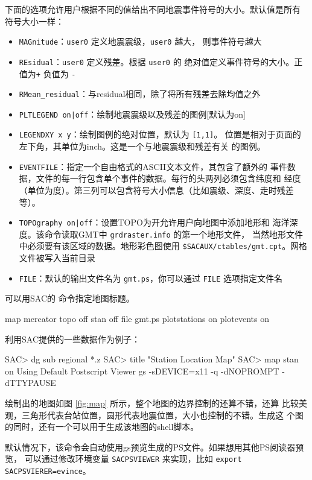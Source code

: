 下面的选项允许用户根据不同的值给出不同地震事件符号的大小。默认值是所有
符号大小一样：
\begin{itemize}
\item \texttt{MAGnitude}：\texttt{user0} 定义地震震级，\texttt{user0} 越大，
    则事件符号越大
\item \texttt{REsidual}：\texttt{user0} 定义残差。根据 \texttt{user0} 的
    绝对值定义事件符号的大小。正值为\texttt{+} 负值为 \texttt{-}
\item \verb|RMean_residual|：与residual相同，除了将所有残差去除均值之外
\item \texttt{PLTLEGEND on|off}：绘制地震震级以及残差的图例[默认为on]
\item \texttt{LEGENDXY x y}：绘制图例的绝对位置，默认为 \texttt{[1,1]}。
    位置是相对于页面的左下角，其单位为inch。这是一个与地震震级和残差有关
    的图例。
\item \texttt{EVENTFILE}：指定一个自由格式的ASCII文本文件，其包含了额外的
    事件数据，文件的每一行包含单个事件的数据。每行的头两列必须包含纬度和
    经度（单位为度）。第三列可以包含符号大小信息（比如震级、深度、走时残差等）。
\item \texttt{TOPOgraphy on|off}：设置TOPO为开允许用户向地图中添加地形和
    海洋深度。该命令读取GMT中 \texttt{grdraster.info} 的第一个地形文件，
    当然地形文件中必须要有该区域的数据。地形彩色图使用
    \verb|$SACAUX/ctables/gmt.cpt|。网格文件被写入当前目录
\item \texttt{FILE}：默认的输出文件名为 \texttt{gmt.ps}，你可以通过
    \texttt{FILE} 选项指定文件名
\end{itemize}
可以用SAC的  命令指定地图标题。

\begin{SACDFT}
map mercator topo off stan off file gmt.ps plotstations on
    plotevents on
\end{SACDFT}

利用SAC提供的一些数据作为例子：
\begin{SACCode}
SAC> dg sub regional *.z
SAC> title "Station Location Map"
SAC> map stan on
Using Default Postscript Viewer
	gs -sDEVICE=x11 -q -dNOPROMPT -dTTYPAUSE
\end{SACCode}
绘制出的地图如图 \ref{fig:map} 所示，整个地图的边界控制的还算不错，还算
比较美观，三角形代表台站位置，圆形代表地震位置，大小也控制的不错。生成这
个图的同时，还有一个可以用于生成该地图的shell脚本。

默认情况下，该命令会自动使用gs预览生成的PS文件。如果想用其他PS阅读器预览，
可以通过修改环境变量 \texttt{SACPSVIEWER} 来实现，比如
\texttt{export SACPSVIERER=evince}。

